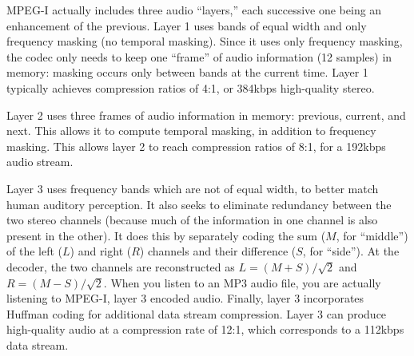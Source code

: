 MPEG-I actually includes three audio ``layers,'' each successive one
being an enhancement of the previous. Layer 1 uses bands of equal
width and only frequency masking (no temporal masking). Since it uses
only frequency masking, the codec only needs to keep one ``frame'' of
audio information (12 samples) in memory: masking occurs only between
bands at the current time. Layer 1 typically achieves compression
ratios of 4:1, or 384kbps high-quality stereo.

Layer 2 uses three frames of audio information in memory: previous,
current, and next.  This allows it to compute temporal masking, in
addition to frequency masking.  This allows layer 2 to reach
compression ratios of 8:1, for a 192kbps audio stream.

Layer 3 uses frequency bands which are not of equal width, to better
match human auditory perception.  It also seeks to eliminate
redundancy between the two stereo channels (because much of the
information in one channel is also present in the other). It does this
by separately coding the sum ($M$, for ``middle'') of the left ($L$)
and right ($R$) channels and their difference ($S$, for ``side'').  At
the decoder, the two channels are reconstructed as $L =
(M+S)/\sqrt{2}$ and $R = (M-S)/\sqrt{2}$. When you listen to an MP3
audio file, you are actually listening to MPEG-I, layer 3 encoded
audio. Finally, layer 3 incorporates Huffman coding for additional
data stream compression. Layer 3 can produce high-quality audio at a
compression rate of 12:1, which corresponds to a 112kbps data stream.
\end{window}

